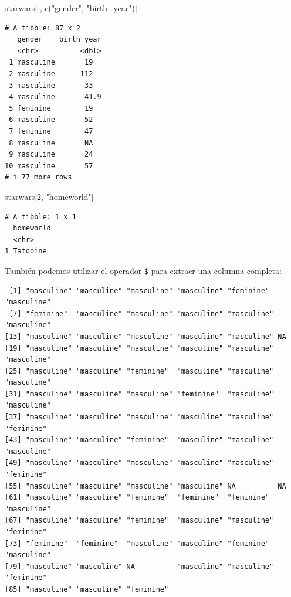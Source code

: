 \documentclass[
  letterpaper,
  DIV=11,
  numbers=noendperiod]{scrreprt}
\newenvironment{Shaded}{\begin{snugshade}}{\end{snugshade}}
\newcommand{\DecValTok}[1]{\textcolor[rgb]{0.68,0.00,0.00}{#1}}
\newcommand{\FunctionTok}[1]{\textcolor[rgb]{0.28,0.35,0.67}{#1}}
\newcommand{\NormalTok}[1]{\textcolor[rgb]{0.00,0.23,0.31}{#1}}
\newcommand{\SpecialCharTok}[1]{\textcolor[rgb]{0.37,0.37,0.37}{#1}}
\newcommand{\StringTok}[1]{\textcolor[rgb]{0.13,0.47,0.30}{#1}}
\begin{document}
\begin{Shaded}
\begin{Highlighting}[]
\NormalTok{starwars[ , }\FunctionTok{c}\NormalTok{(}\StringTok{"gender"}\NormalTok{, }\StringTok{"birth\_year"}\NormalTok{)]}
\end{Highlighting}
\end{Shaded}

\begin{verbatim}
# A tibble: 87 x 2
   gender    birth_year
   <chr>          <dbl>
 1 masculine       19  
 2 masculine      112  
 3 masculine       33  
 4 masculine       41.9
 5 feminine        19  
 6 masculine       52  
 7 feminine        47  
 8 masculine       NA  
 9 masculine       24  
10 masculine       57  
# i 77 more rows
\end{verbatim}

\begin{Shaded}
\begin{Highlighting}[]
\NormalTok{starwars[}\DecValTok{2}\NormalTok{, }\StringTok{"homeworld"}\NormalTok{]}
\end{Highlighting}
\end{Shaded}

\begin{verbatim}
# A tibble: 1 x 1
  homeworld
  <chr>    
1 Tatooine 
\end{verbatim}

También podemos utilizar el operador \texttt{\$} para extraer una
columna completa:

\begin{Shaded}
\end{Shaded}

\begin{verbatim}
 [1] "masculine" "masculine" "masculine" "masculine" "feminine"  "masculine"
 [7] "feminine"  "masculine" "masculine" "masculine" "masculine" "masculine"
[13] "masculine" "masculine" "masculine" "masculine" "masculine" NA         
[19] "masculine" "masculine" "masculine" "masculine" "masculine" "masculine"
[25] "masculine" "masculine" "feminine"  "masculine" "masculine" "masculine"
[31] "masculine" "masculine" "masculine" "feminine"  "masculine" "masculine"
[37] "masculine" "masculine" "masculine" "masculine" "masculine" "feminine" 
[43] "masculine" "masculine" "feminine"  "masculine" "masculine" "masculine"
[49] "masculine" "masculine" "masculine" "masculine" "masculine" "feminine" 
[55] "masculine" "masculine" "masculine" "masculine" NA          NA         
[61] "masculine" "masculine" "feminine"  "feminine"  "feminine"  "masculine"
[67] "masculine" "masculine" "feminine"  "masculine" "masculine" "feminine" 
[73] "feminine"  "feminine"  "masculine" "masculine" "feminine"  "masculine"
[79] "masculine" "masculine" NA          "masculine" "masculine" "feminine" 
[85] "masculine" "masculine" "feminine" 
\end{verbatim}
\end{document}
